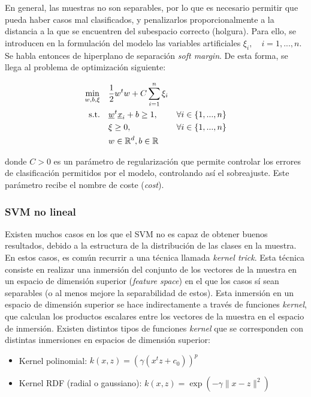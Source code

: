 \documentclass[12pt,a4paper,]{book}
\providecommand{\tightlist}{%
  \setlength{\itemsep}{0pt}\setlength{\parskip}{0pt}}
\numberwithin{dummy}{section}
\theoremstyle{ocrenumbox}
\theoremstyle{blacknumex}
\theoremstyle{blacknumbox}
\theoremstyle{ocrenum}
\theoremstyle{ocrenum}
\begin{document}
En general, las muestras no son separables, por lo que es necesario
permitir que pueda haber casos mal clasificados, y penalizarlos
proporcionalmente a la distancia a la que se encuentren del subespacio
correcto (holgura). Para ello, se introducen en la formulación del
modelo las variables artificiales \(\xi_i,\quad i=1,...,n\). Se habla
entonces de hiperplano de separación \emph{soft margin}. De esta forma,
se llega al problema de optimización siguiente:

\begin{equation}
\begin{aligned}
\min_{w,b,\xi} \quad & \frac{1}{2}w^{t}w+C\sum_{i=1}^{n}{\xi_{i}}\\
\textrm{s.t.} \quad & \underline w^t \underline x_i+b \ge 1, \quad & \forall i\in \{1,...,n\}\\
  &\xi\geq0,   \quad & \forall i\in \{1,...,n\} \\
  & w \in \mathbb{R}^d, \space b \in \mathbb{R} \\
\end{aligned}
\end{equation}

donde \(C>0\) es un parámetro de regularización que permite controlar
los errores de clasificación permitidos por el modelo, controlando así
el sobreajuste. Este parámetro recibe el nombre de coste (\emph{cost}).

\hypertarget{svm-no-lineal}{%
\subsubsection{SVM no lineal}\label{svm-no-lineal}}

Existen muchos casos en los que el SVM no es capaz de obtener buenos
resultados, debido a la estructura de la distribución de las clases en
la muestra. En estos casos, es común recurrir a una técnica llamada
\emph{kernel trick}. Esta técnica consiste en realizar una inmersión del
conjunto de los vectores de la muestra en un espacio de dimensión
superior (\emph{feature space}) en el que los casos sí sean separables
(o al menos mejore la separabilidad de estos). Esta inmersión en un
espacio de dimensión superior se hace indirectamente a través de
funciones \emph{kernel}, que calculan los productos escalares entre los
vectores de la muestra en el espacio de inmersión. Existen distintos
tipos de funciones \emph{kernel} que se corresponden con distintas
inmersiones en espacios de dimensión superior:

\begin{itemize}
\tightlist
\item
  Kernel polinomial: \(k(x,z) = \left( \gamma(x^tz + c_0) \right)^p\)
\item
  Kernel RDF (radial o gaussiano): \(k(x,z) = \exp(-\gamma \| x-z\|^2)\)
\end{itemize}
\end{document}
